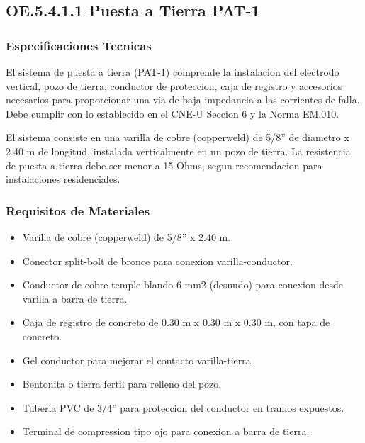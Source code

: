 \subsection{OE.5.4.1.1 Puesta a Tierra PAT-1}

\subsubsection{Especificaciones Tecnicas}

El sistema de puesta a tierra (PAT-1) comprende la instalacion del electrodo vertical, pozo de tierra, conductor de proteccion, caja de registro y accesorios necesarios para proporcionar una via de baja impedancia a las corrientes de falla. Debe cumplir con lo establecido en el CNE-U Seccion 6 y la Norma EM.010.

El sistema consiste en una varilla de cobre (copperweld) de 5/8'' de diametro x 2.40 m de longitud, instalada verticalmente en un pozo de tierra. La resistencia de puesta a tierra debe ser menor a 15 Ohms, segun recomendacion para instalaciones residenciales.

\subsubsection{Requisitos de Materiales}

\begin{itemize}
  \item Varilla de cobre (copperweld) de 5/8'' x 2.40 m.
  \item Conector split-bolt de bronce para conexion varilla-conductor.
  \item Conductor de cobre temple blando 6 mm2 (desnudo) para conexion desde varilla a barra de tierra.
  \item Caja de registro de concreto de 0.30 m x 0.30 m x 0.30 m, con tapa de concreto.
  \item Gel conductor para mejorar el contacto varilla-tierra.
  \item Bentonita o tierra fertil para relleno del pozo.
  \item Tuberia PVC de 3/4'' para proteccion del conductor en tramos expuestos.
  \item Terminal de compression tipo ojo para conexion a barra de tierra.
\end{itemize}

